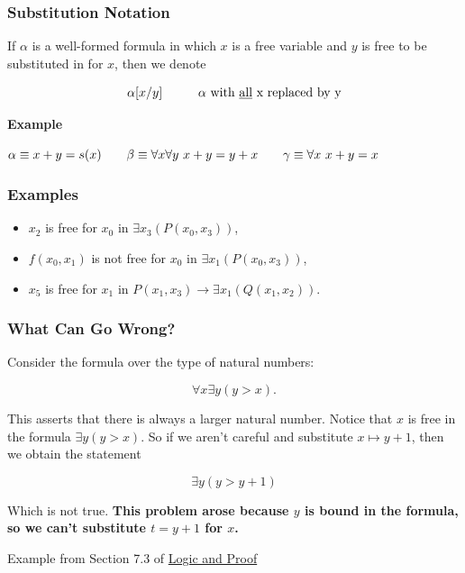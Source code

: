 \documentclass{beamer}
\theoremstyle{indentDefn} \newtheorem{defn}[]{Definition}
\begin{document}
\begin{frame}
	\frametitle{Substitution Notation}

	If $\alpha$ is a well-formed formula in which $x$ is a free variable and $y$ is free to be substituted in for $x$, then we denote 

	$$\alpha[x/y] \hspace{10mm} \alpha\text{ with \underline{all} x replaced by y}$$

	\textbf{Example}

	$\alpha \equiv x + y = s(x) \hspace{7mm} \beta \equiv \forall x \forall y \ x + y = y + x \hspace{7mm} \gamma \equiv \forall x \ x + y = x$

	\vspace{40mm}


\end{frame}

\begin{frame}
	\frametitle{Examples}

	\begin{itemize}
		\item[]	$x_{2}$ is free for $x_{0}$ in $\exists x_{3} (P(x_{0},x_{3}))$, \vspace{0.2cm}
		\item[] $f(x_{0},x_{1})$ is not free for $x_{0}$ in $\exists x_{1} (P(x_{0},x_{3}))$, \vspace{0.2cm}
		\item[] $x_{5}$ is free for $x_{1}$ in $P(x_{1},x_{3})\rightarrow \exists x_{1} (Q(x_{1},x_{2}))$.
	\end{itemize}	
		
\end{frame}

\begin{frame}
	\frametitle{What Can Go Wrong?}
	
	Consider the formula over the type of natural numbers: 
	
	$$\forall x \exists y (y > x).$$
	
	This asserts that there is always a larger natural number. Notice that $x$ is free in the formula $\exists y (y > x)$. So if we aren't careful and substitute $x \mapsto y+1$, then we obtain the statement 
	
	$$ \exists y (y > y+1)$$
	
	Which is not true. {\bf This problem arose because $y$ is bound in the formula, so we can't substitute $t=y+1$ for $x$.}
	
	\footnotesize{Example from Section 7.3 of \href{https://leanprover.github.io/logic_and_proof_lean3/index.html}{Logic and Proof}}
	
\end{frame}
\end{document}
